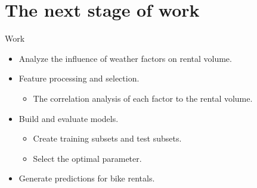 \documentclass[
  size=14pt,
  paper=smartboard,  %
  mode=present, 		%
  display=slides, 	%
  style=tuliplab,  	%
  pauseslide,
  fleqn,leqno]{powerdot}
\begin{document}
\section{The next stage of work}
\begin{slide}{Work}
\begin{itemize}
  \item
  Analyze the influence of weather factors on rental volume.
  \vspace{0.8em}
  \item
  Feature processing and selection.
  \begin{itemize}
  \item
  \smallskip
  The correlation analysis of each factor to the rental volume.
  \end{itemize}
\end{itemize}
  \begin{itemize}
  \item
  Build and evaluate models.
  \begin{itemize}
    \item
    \smallskip
    Create training subsets and test subsets.
    \item
    \smallskip
    Select the optimal parameter.
    \end{itemize}
  \end{itemize}
  \begin{itemize}
    \item
    Generate predictions for bike rentals.
  \end{itemize}
  

\end{slide}











\end{document}
